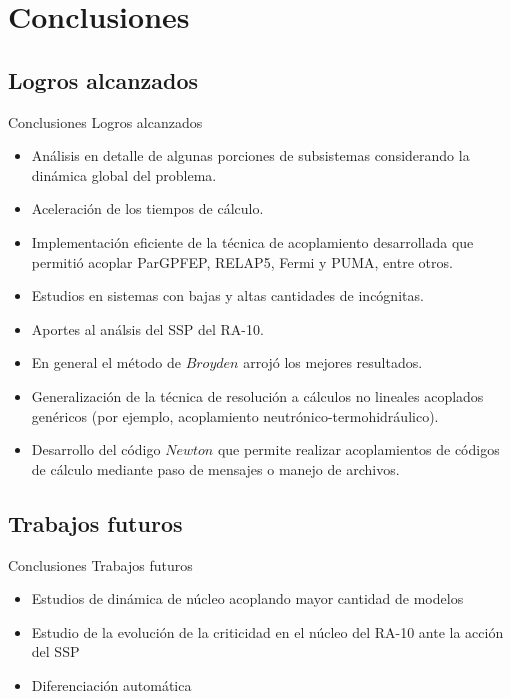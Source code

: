 \section{Conclusiones}

\subsection*{Logros alcanzados}
\normalsize
\begin{frame}
{Conclusiones}
{Logros alcanzados}

\begin{itemize}
\item <2-> Análisis en detalle de algunas porciones de subsistemas considerando la dinámica global del problema.
\item <3-> Aceleración de los tiempos de cálculo.
\item <4-> Implementación eficiente de la técnica de acoplamiento desarrollada que permitió acoplar ParGPFEP, RELAP5, Fermi y PUMA, entre otros.
\item <5-> Estudios en sistemas con bajas y altas cantidades de incógnitas.
\item <6-> Aportes al análsis del SSP del RA-10.
\item <7-> En general el método de $Broyden$ arrojó los mejores resultados.
\item <8-> Generalización de la técnica de resolución a cálculos no lineales acoplados genéricos (por ejemplo, acoplamiento neutrónico-termohidráulico).
\item <9-> Desarrollo del código $Newton$ que permite realizar acoplamientos de códigos de cálculo mediante paso de mensajes o manejo de archivos.
\end{itemize}

\end{frame}

\subsection*{Trabajos futuros}

\begin{frame}
{Conclusiones}
{Trabajos futuros}

\begin{itemize}
\item <2-> Estudios de dinámica de núcleo acoplando mayor cantidad de modelos
\item <3-> Estudio de la evolución de la criticidad en el núcleo del RA-10 ante la acción del SSP
\item <4-> Diferenciación automática
\end{itemize}

\end{frame}
